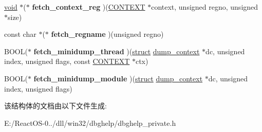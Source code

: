 \begin{DoxyCompactItemize}
\item 
\mbox{\label{structcpu_ab4a771f78c2f3ee116d178b2f73e043e}} 
\hyperlink{interfacevoid}{void} $\ast$($\ast$ {\bfseries fetch\+\_\+context\+\_\+reg} )(\hyperlink{struct___c_o_n_t_e_x_t}{C\+O\+N\+T\+E\+XT} $\ast$context, unsigned regno, unsigned $\ast$size)
\item 
\mbox{\label{structcpu_aa16f19a6726571179e1b81c7366c7498}} 
const char $\ast$($\ast$ {\bfseries fetch\+\_\+regname} )(unsigned regno)
\item 
\mbox{\label{structcpu_a0f4a19268a397fca8eddaeb51066f87c}} 
B\+O\+OL($\ast$ {\bfseries fetch\+\_\+minidump\+\_\+thread} )(\hyperlink{interfacestruct}{struct} \hyperlink{structdump__context}{dump\+\_\+context} $\ast$dc, unsigned index, unsigned flags, const \hyperlink{struct___c_o_n_t_e_x_t}{C\+O\+N\+T\+E\+XT} $\ast$ctx)
\item 
\mbox{\label{structcpu_a30804a503963802b01919fed5cbffac9}} 
B\+O\+OL($\ast$ {\bfseries fetch\+\_\+minidump\+\_\+module} )(\hyperlink{interfacestruct}{struct} \hyperlink{structdump__context}{dump\+\_\+context} $\ast$dc, unsigned index, unsigned flags)
\end{DoxyCompactItemize}


该结构体的文档由以下文件生成\+:\begin{DoxyCompactItemize}
\item 
E\+:/\+React\+O\+S-\/0../dll/win32/dbghelp/dbghelp\+\_\+private.\+h\end{DoxyCompactItemize}
